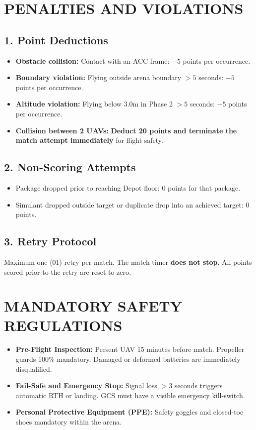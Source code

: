 \documentclass[12pt,a4paper]{article}
\begin{document}
\section{PENALTIES AND VIOLATIONS}

\subsection*{1. Point Deductions}
\begin{itemize}
\item \textbf{Obstacle collision:} Contact with an ACC frame: $-5$ points per occurrence.
\item \textbf{Boundary violation:} Flying outside arena boundary $>5$ seconds: $-5$ points per occurrence.
\item \textbf{Altitude violation:} Flying below $3.0$m in Phase 2 $>5$ seconds: $-5$ points per occurrence.
\item \textbf{Collision between 2 UAVs:} \textbf{Deduct 20 points and terminate the match attempt immediately} for flight safety.
\end{itemize}

\subsection*{2. Non-Scoring Attempts}
\begin{itemize}
\item Package dropped prior to reaching Depot floor: 0 points for that package.
\item Simulant dropped outside target or duplicate drop into an achieved target: 0 points.
\end{itemize}

\subsection*{3. Retry Protocol}
Maximum one (01) retry per match. The match timer \textbf{does not stop}. All points scored prior to the retry are reset to zero.

\section{MANDATORY SAFETY REGULATIONS}

\begin{itemize}
\item \textbf{Pre-Flight Inspection:} Present UAV 15 minutes before match. Propeller guards 100\% mandatory. Damaged or deformed batteries are immediately disqualified.
\item \textbf{Fail-Safe and Emergency Stop:} Signal loss $>3$ seconds triggers automatic RTH or landing. GCS must have a visible emergency kill-switch.
\item \textbf{Personal Protective Equipment (PPE):} Safety goggles and closed-toe shoes mandatory within the arena.
\end{itemize}
\end{document}
